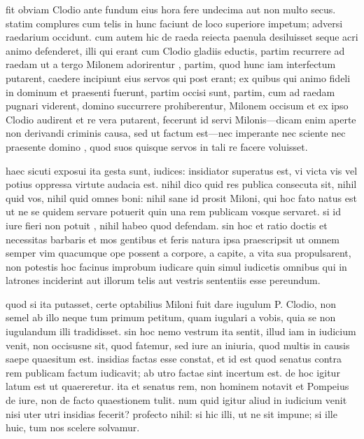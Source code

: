  fit obviam Clodio ante fundum eius hora fere undecima aut non multo secus. statim complures cum telis in hunc faciunt de loco superiore impetum; adversi raedarium occidunt. cum autem hic de raeda reiecta paenula desiluisset seque acri animo defenderet, illi qui erant cum Clodio gladiis eductis, partim recurrere ad raedam ut a tergo Milonem adorirentur , partim, quod hunc iam interfectum putarent, caedere incipiunt eius servos qui post erant; ex quibus qui animo fideli in dominum et praesenti fuerunt, partim occisi sunt, partim, cum ad raedam pugnari viderent, domino succurrere prohiberentur, Milonem occisum et ex ipso Clodio audirent et re vera putarent, fecerunt id servi Milonis—dicam enim aperte non derivandi criminis causa, sed ut factum est—nec imperante nec sciente nec praesente domino , quod suos quisque servos in tali re facere voluisset.

 haec sicuti exposui ita gesta sunt, iudices: insidiator superatus est, vi victa vis vel potius oppressa virtute audacia est. nihil dico quid res publica consecuta sit, nihil quid vos, nihil quid omnes boni: nihil sane id prosit Miloni, qui hoc fato natus est ut ne se quidem servare potuerit quin una rem publicam vosque servaret. si id iure fieri non potuit , nihil habeo quod defendam. sin hoc et ratio doctis et necessitas barbaris et mos gentibus et feris natura ipsa praescripsit ut omnem semper vim quacumque ope possent a corpore, a capite, a vita sua propulsarent, non potestis hoc facinus improbum iudicare quin simul iudicetis omnibus qui in latrones inciderint aut illorum telis aut vestris sententiis esse pereundum.

 quod si ita putasset, certe optabilius Miloni fuit dare iugulum P. Clodio, non semel ab illo neque tum primum petitum, quam iugulari a vobis, quia se non iugulandum illi tradidisset. sin hoc nemo vestrum ita sentit, illud iam in iudicium venit, non occisusne sit, quod fatemur, sed iure an iniuria, quod multis in causis saepe quaesitum est. insidias factas esse constat, et id est quod senatus contra rem publicam factum iudicavit; ab utro factae sint incertum est. de hoc igitur latum est ut quaereretur. ita et senatus rem, non hominem notavit et Pompeius de iure, non de facto quaestionem tulit. num quid igitur aliud in iudicium venit nisi uter utri insidias fecerit? profecto nihil: si hic illi, ut ne sit impune; si ille huic, tum nos scelere solvamur.

